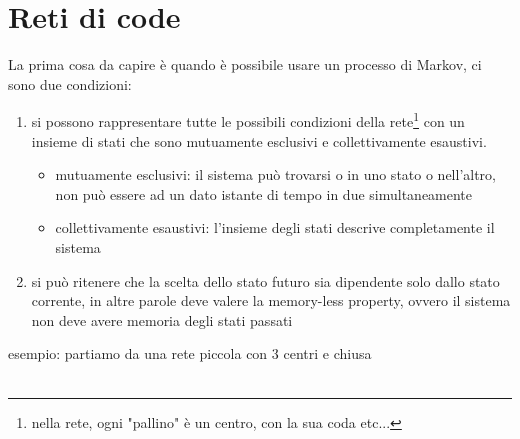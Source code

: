 \documentclass{article}
\begin{document}
\section{Reti di code}
La prima cosa da capire è quando è possibile usare un processo di Markov, ci sono due condizioni:
\begin{enumerate}
\item si possono rappresentare tutte le possibili condizioni della rete\footnote{nella rete, ogni "pallino" è un centro, con la sua coda etc...} con un insieme di stati che sono mutuamente esclusivi e collettivamente esaustivi. 
\begin{itemize}
\item mutuamente esclusivi: il sistema può trovarsi o in uno stato o nell'altro, non può essere ad un dato istante di tempo in due simultaneamente
\item collettivamente esaustivi: l'insieme degli stati descrive completamente il sistema
\end{itemize}
\item si può ritenere che la scelta dello stato futuro sia dipendente solo dallo stato corrente, in altre parole deve valere la memory-less property, ovvero il sistema non deve avere memoria degli stati passati
\end{enumerate}
esempio: partiamo da una rete piccola con 3 centri e chiusa\\
\\
\end{document}
